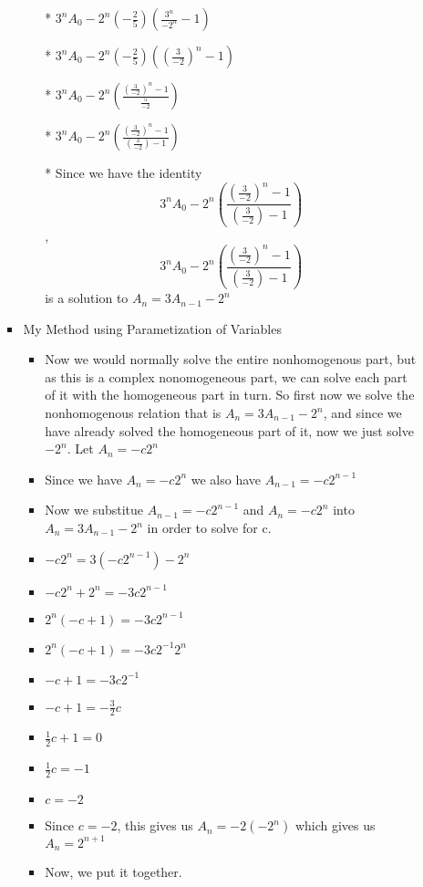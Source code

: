 \begin{enumerate}
\begin{enumerate}
\begin{itemize}
\begin{itemize}
      \item [*] $3^{n}A_{0} -2^{n}(-\frac{2}{5})\left(\frac{3^{n}}{-2^{n}}-1\right)$
      \item [*] $3^{n}A_{0} -2^{n}(-\frac{2}{5})\left(\left(\frac{3}{-2}\right)^{n}-1\right)$
      \item [*] $3^{n}A_{0} -2^{n}\left(\frac{\left(\frac{3}{-2}\right)^{n}-1}{\frac{5}{-2}}\right)$
      \item [*] $3^{n}A_{0} -2^{n}\left(\frac{\left(\frac{3}{-2}\right)^{n}-1}{\left(\frac{3}{-2}\right)-1}\right)$
      \item [*] Since we have the identity $$3^{n}A_{0} -2^{n}\left(\frac{\left(\frac{3}{-2}\right)^{n}-1}{\left(\frac{3}{-2}\right)-1}\right)$$, $$3^{n}A_{0} -2^{n}\left(\frac{\left(\frac{3}{-2}\right)^{n}-1}{\left(\frac{3}{-2}\right)-1}\right)$$ is a solution to $A_{n}=3A_{n-1}-2^{n}$
      \end{itemize} %
    \item My Method using Parametization of Variables
      \begin{itemize} %
      \item Now we would normally solve the entire nonhomogenous part, but as this is a complex nonomogeneous part, we can solve each part of it with the homogeneous part in turn. So first now we solve the nonhomogenous relation that is $A_{n}=3A_{n-1}-2^{n}$, and since we have already solved the homogeneous part of it, now we just solve $-2^{n}$. Let $A_{n}=-c2^{n}$
      \item Since we have $A_{n}=-c2^{n}$ we also have $A_{n-1}=-c2^{n-1}$
      \item Now we substitue $A_{n-1}=-c2^{n-1}$ and $A_{n}=-c2^{n}$ into $A_{n}=3A_{n-1}-2^{n}$ in order to solve for c.
      \item $-c2^{n}=3(-c2^{n-1})-2^{n}$
      \item $-c2^{n}+2^{n}=-3c2^{n-1}$
      \item $2^{n}(-c+1)=-3c2^{n-1}$
      \item $2^{n}(-c+1)=-3c2^{-1}2^{n}$
      \item $-c+1=-3c2^{-1}$
      \item $-c+1=-\frac{3}{2}c$
      \item $\frac{1}{2}c+1=0$
      \item $\frac{1}{2}c=-1$
      \item $c=-2$
      \item Since $c=-2$, this gives us $A_{n}=-2(-2^{n})$ which gives us $A_{n}=2^{n+1}$
      \item Now, we put it together.

\end{itemize}
\end{itemize}
\end{enumerate}
\end{enumerate}
